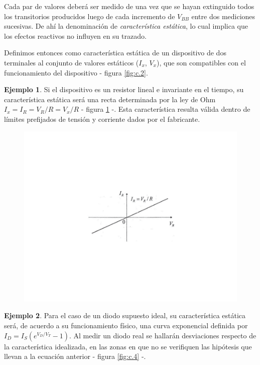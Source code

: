 \documentclass{book} %
\theoremstyle{definition}
\newtheorem{exmp}{Ejemplo}[]
\begin{document}
\begin{appendices}
Cada par de valores deberá ser medido de una vez que se hayan extinguido todos los transitorios producidos luego de cada incremento de $V_{BB}$ entre dos mediciones sucesivas. De ahí la denominación de \emph{característica estática}, lo cual implica que los efectos reactivos no influyen en su trazado.

Definimos entonces como característica estática de un dispositivo de dos terminales al conjunto de valores estáticos ($I_x$, $V_x$), que son compatibles con el funcionamiento del dispositivo - figura \ref{fig:c.2}.

\begin{exmp}
Si el dispositivo es un resistor lineal e invariante en el tiempo, su característica estática será una recta determinada por la ley de Ohm $I_x=I_R=V_R/R=V_x/R$ - figura \ref{fig:c.3} -. Esta característica resulta válida dentro de límites prefijados de tensión y corriente dados por el fabricante.

\begin{figure}[!htbp]
    \centering
    \includegraphics[scale=1]{figurac03.pdf}
    \caption{}
    \label{fig:c.3}
\end{figure}

\end{exmp}

\begin{exmp}
Para el caso de un diodo supuesto ideal, su característica estática será, de acuerdo a su funcionamiento físico, una curva exponencial definida por $I_D=I_S\left(e^{V_D/V_T}-1\right)$. Al medir un diodo real se hallarán desviaciones respecto de la característica idealizada, en las zonas en que no se verifiquen las hipótesis que llevan a la ecuación anterior - figura \ref{fig:c.4} -.


\end{exmp}
\end{appendices}
\end{document}
